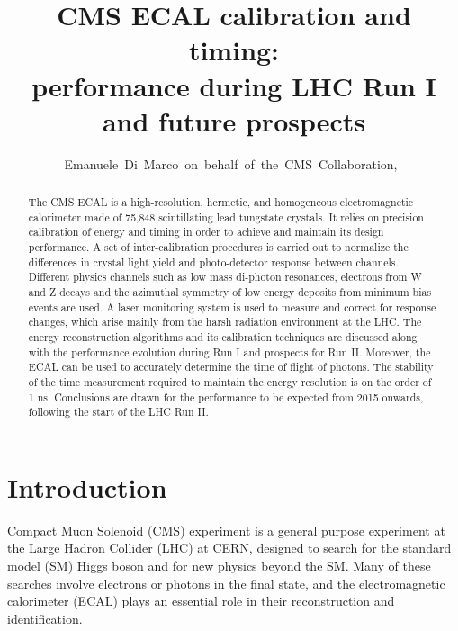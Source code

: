 \documentclass[journal]{IEEEtran}
\begin{document}
\title{CMS ECAL calibration and timing: \\ performance during LHC Run I and future prospects}

\author{Emanuele~Di~Marco~on~behalf~of~the~CMS~Collaboration,~}

\maketitle


\begin{abstract}
The CMS ECAL is a high-resolution, hermetic, and homogeneous electromagnetic calorimeter made of 75,848 scintillating lead tungstate crystals. It relies on precision calibration of energy and timing in order to achieve and maintain its design performance. A set of inter-calibration procedures is carried out to normalize the differences in crystal light yield and photo-detector response between channels. Different physics channels such as low mass di-photon resonances, electrons from W and Z decays and the azimuthal symmetry of low energy deposits from minimum bias events are used. A laser monitoring system is used to measure and correct for response changes, which arise mainly from the harsh radiation environment at the LHC. The energy reconstruction algorithms and its calibration techniques are discussed along with the performance evolution during Run I and prospects for Run II. Moreover, the ECAL can be used to accurately determine the time of flight of photons. The stability of the time measurement required to maintain the energy resolution is on the order of 1 ns. Conclusions are drawn for the performance to be expected from 2015 onwards, following the start of the LHC Run II.
\end{abstract}

\begin{IEEEkeywords}
\end{IEEEkeywords}

\IEEEpeerreviewmaketitle



\section{Introduction}
\label{sec:introduction}
 Compact Muon Solenoid (CMS) experiment \cite{Chatrchyan:2008aa} is a general purpose experiment at the Large Hadron Collider (LHC) at CERN, designed to search for the standard model (SM) Higgs boson and for new physics beyond the SM. Many of these searches involve electrons or photons in the final state, and the electromagnetic calorimeter (ECAL) plays an essential role in their reconstruction and identification.
\end{document}
